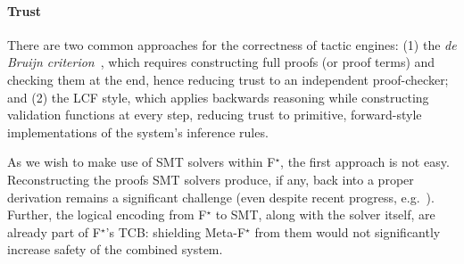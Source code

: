 \documentclass[runningheads]{llncs}
\newcommand\fstar{F$^\star$\xspace}
\newcommand\metafstar{Meta-F$^\star$\xspace}
\newcommand{\comm}[3]{\ifcheckpagebudget\else\ifdraft{{\color{#1}[#2: #3]}}\fi\fi}
\newcommand{\ch}[1]{\comm{teal}{CH}{#1}}
\newcommand{\guido}[1]{\comm{blue}{Guido}{#1}}
\begin{document}



\paragraph{\bf Trust}
\label{sec:trust}

There are two common approaches for the correctness of tactic engines:
%
(1) the \emph{de Bruijn
criterion}~\cite{Barendregt:2001:PUD:778522.778527}, which
requires constructing full proofs (or proof terms)
and checking them at the end, hence reducing trust to
an independent proof-checker; 
%
and (2) the LCF style, which applies backwards reasoning while
constructing validation functions at every
step, reducing trust to primitive, forward-style implementations of the
system's inference rules.

As we wish to make use of SMT solvers
within \fstar, the first approach is not easy.
%
Reconstructing the proofs SMT solvers produce, if any, back into a
proper derivation remains a significant challenge (even despite recent
progress, e.g.~\cite{BohmeW10,smtcoqCAV2017}).
%
Further, the logical encoding from \fstar to
SMT, along with the solver itself, are already part of \fstar's
TCB: shielding \metafstar from them would not significantly increase
safety of the combined system.
\end{document}
